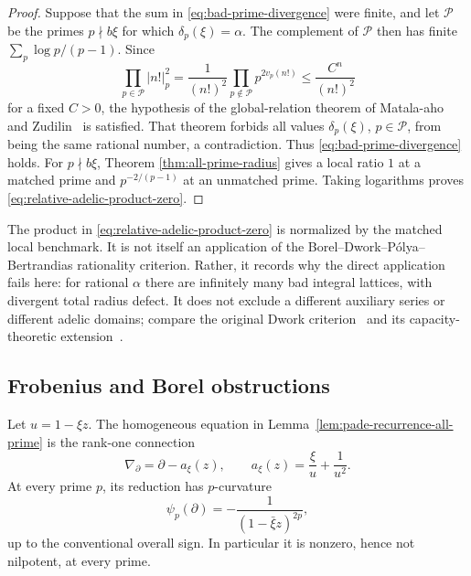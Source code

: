 \begin{proof}
Suppose that the sum in \eqref{eq:bad-prime-divergence} were finite, and let
$\mathcal P$ be the primes $p\nmid b\xi$ for which
$\delta_p(\xi)=\alpha$.  The complement of $\mathcal P$ then has finite
$\sum_p\log p/(p-1)$.  Since
\[
 \prod_{p\in\mathcal P}|n!|_p^2
 =\frac1{(n!)^2}\prod_{p\notin\mathcal P}p^{2v_p(n!)}
 \leq\frac{C^n}{(n!)^2}
\]
for a fixed $C>0$, the hypothesis of the global-relation theorem of
Matala-aho and Zudilin~\cite{MZ2018} is satisfied.  That
theorem forbids all values $\delta_p(\xi)$, $p\in\mathcal P$, from being the
same rational number, a contradiction.  Thus
\eqref{eq:bad-prime-divergence} holds.  For $p\nmid b\xi$, Theorem
\ref{thm:all-prime-radius} gives a local ratio $1$ at a matched prime and
$p^{-2/(p-1)}$ at an unmatched prime.  Taking logarithms proves
\eqref{eq:relative-adelic-product-zero}.
\end{proof}

\begin{remark}
The product in \eqref{eq:relative-adelic-product-zero} is normalized by the
matched local benchmark.  It is not itself an application of the
Borel--Dwork--P\'olya--Bertrandias rationality criterion.  Rather, it records
why the direct application fails here: for rational $\alpha$ there are
infinitely many bad integral lattices, with divergent total radius defect.
It does not exclude a different auxiliary series or different adelic
domains; compare the original Dwork criterion~\cite{Dwork1960} and its
capacity-theoretic extension~\cite{BostChambertLoir2009}.
\end{remark}

\subsection{Frobenius and Borel obstructions}

\begin{proposition}
\label{prop:exact-p-curvature}
Let $u=1-\xi z$.  The homogeneous equation in
Lemma~\ref{lem:pade-recurrence-all-prime} is the rank-one connection
\[
 \nabla_\partial=\partial-a_\xi(z),
 \qquad
 a_\xi(z)=\frac{\xi}{u}+\frac1{u^2}.
\]
At every prime $p$, its reduction has $p$-curvature
\begin{equation}
 \psi_p(\partial)=-\frac1{(1-\bar\xi z)^{2p}},
\label{eq:exact-p-curvature}
\end{equation}
up to the conventional overall sign.  In particular it is nonzero, hence
not nilpotent, at every prime.
\end{proposition}

